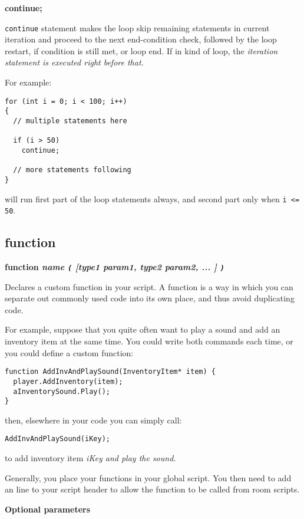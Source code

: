 \bf{continue};

\verb$continue$ statement makes the loop skip remaining statements in current iteration and proceed to the next end-condition check,
followed by the loop restart, if condition is still met, or loop end.
If in  kind of loop, the \it{iteration} statement is executed right before that.

For example:

\begin{verbatim}
for (int i = 0; i < 100; i++)
{
  // multiple statements here
  
  if (i > 50)
    continue;
  
  // more statements following
}
\end{verbatim}

will run first part of the loop statements always, and second part only when \verb$i <= 50$.


\subsection{function}\label{function}%

\bf{function} \it{name} \verb$($ [\it{type1 param1}, \it{type2 param2}, ... ] \verb$)$

Declares a custom function in your script. A function is a way in which you can
separate out commonly used code into its own place, and thus avoid duplicating code.

For example, suppose that you quite often want to play a sound and add an inventory item
at the same time. You could write both commands each time, or you could define a custom
function:

\begin{verbatim}
function AddInvAndPlaySound(InventoryItem* item) {
  player.AddInventory(item);
  aInventorySound.Play();
}
\end{verbatim}

then, elsewhere in your code you can simply call:
\begin{verbatim}
AddInvAndPlaySound(iKey);
\end{verbatim}
to add inventory item \it{iKey} and play the sound.

Generally, you place your functions in your global script. You then need to add
an  line to your script header to allow the function to be called
from room scripts.

\bf{Optional parameters}

